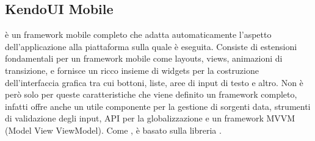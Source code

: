 		\subsection{KendoUI Mobile}
			\kendomob{} è un framework mobile completo che adatta
			automaticamente	l'aspetto dell'applicazione alla piattaforma sulla
			quale è eseguita. Consiste di estensioni fondamentali per un
			framework mobile come layouts, views, animazioni di transizione,
			e fornisce un ricco insieme di widgets per la costruzione
			dell'interfaccia grafica tra cui bottoni, liste, aree di input di
			testo e altro. Non è però solo per queste caratteristiche che viene
			definito un framework completo, infatti \kendomob{} offre anche
			un utile componente per la gestione di sorgenti data, strumenti di
			validazione degli input, API per la globalizzazione e un framework
			MVVM (Model View ViewModel). Come \jqm{}, \kendomob{} è
			basato sulla libreria \js{} \jq{}.
			
